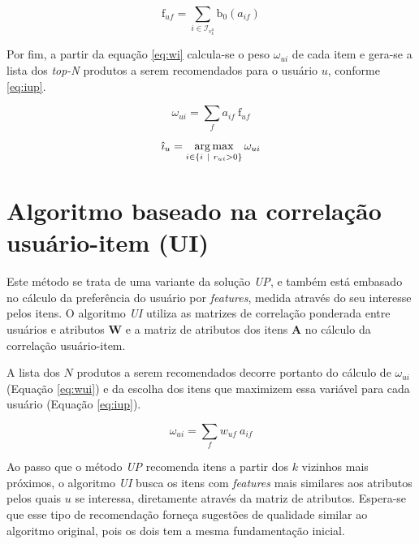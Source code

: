 \begin{equation}
\label{eq:frf} 
\mathrm{f}_{uf} = \sum_{i \in \mathcal{I}_{v_k^u}}{\mathrm{b}_0\left(a_{if}\right)}
\end{equation} 

Por fim, a partir da equação \ref{eq:wi} calcula-se o peso $\omega_{ui}$ de cada item e gera-se a lista dos \textit{top-N} produtos a serem recomendados para o usuário $u$, conforme \ref{eq:iup}. 

\begin{equation}
\label{eq:wi} 
    \omega_{ui} = \sum_{f}{a_{if}~\mathrm{f}_{uf}}
\end{equation} 

\begin{equation}
\label{eq:iup} 
    \hat{\imath}_u = \operatorname*{arg\,max}_{i \in \left\{i~|~r_{ui} > 0\right\}}{\omega_{ui}}
\end{equation} 

\section{Algoritmo baseado na correlação usuário-item (UI)} %
\label{sec:algoritmo_baseado_na_correla_o_usu_rio_item_ui_}

Este método se trata de uma variante da solução \textit{UP}, e também está embasado no cálculo da preferência do usuário por \textit{features}, medida através do seu interesse pelos itens. O algoritmo \textit{UI} utiliza as matrizes de correlação ponderada entre usuários e atributos $\mathbf{W}$ e a matriz de atributos dos itens $\mathbf{A}$ no cálculo da correlação usuário-item.

A lista dos $N$ produtos a serem recomendados decorre portanto do cálculo de $\omega_{ui}$ (Equação \ref{eq:wui}) e da escolha dos itens que maximizem essa variável para cada usuário (Equação \ref{eq:iup}).

\begin{equation}
\label{eq:wui} 
    \omega_{ui} = \sum_{f}{w_{uf}~a_{if}}
\end{equation} 

Ao passo que o método \textit{UP} recomenda itens a partir dos $k$ vizinhos mais próximos, o algoritmo \textit{UI} busca os itens com \textit{features} mais similares aos atributos pelos quais $u$ se interessa, diretamente através da matriz de atributos. Espera-se que esse tipo de recomendação forneça sugestões de qualidade similar ao algoritmo original, pois os dois tem a mesma fundamentação inicial. 


